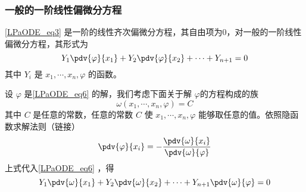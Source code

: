 \subsubsection{一般的一阶线性偏微分方程}
\autoref{LPaODE_eq3} 是一阶的线性齐次偏微分方程，其自由项为0，对一般的一阶线性偏微分方程，其形式为
\begin{equation}\label{LPaODE_eq6}
Y_1\pdv{\varphi}{x_1}+Y_2\pdv{\varphi}{x_2}+\cdots+Y_{n+1}=0
\end{equation}
其中 $Y_i$ 是 $x_1,\cdots,x_n,\varphi$ 的函数。

设 $\varphi$ 是\autoref{LPaODE_eq6} 的解，我们考虑下面关于解 $\varphi$的方程构成的族
\begin{equation}
\omega(x_1,\cdots,x_n,\varphi)=C
\end{equation}
其中 $C$ 是任意的常数，任意的常数 $C$ 使 $x_1,\cdots,x_n,\varphi$ 能够取任意的值。依照隐函数求解法则（链接）
\begin{equation}
\pdv{\varphi}{x_i}=-\frac{\pdv{\omega}{x_i}}{\pdv{\omega}{\varphi}}
\end{equation}
上式代入\autoref{LPaODE_eq6} ，得
\begin{equation}
Y_1\pdv{\omega}{x_1}+Y_2\pdv{\omega}{x_2}+\cdots+Y_{n+1}\pdv{\omega}{\varphi}=0
\end{equation}

